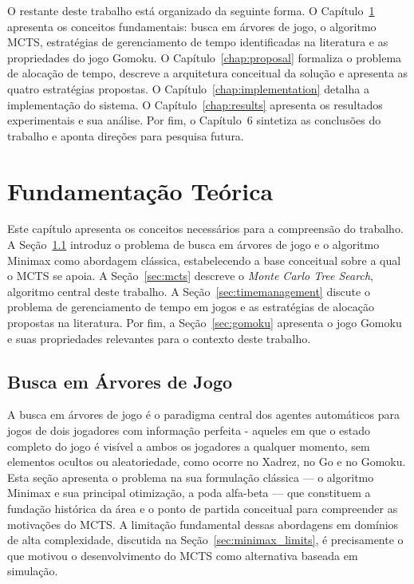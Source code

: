 \documentclass[cic,tc]{iiufrgs}
\begin{document}
O restante deste trabalho está organizado da seguinte forma. O Capítulo~\ref{chap:background} apresenta os conceitos fundamentais: busca em árvores de jogo, o algoritmo MCTS, estratégias de gerenciamento de tempo identificadas na literatura e as propriedades do jogo Gomoku. O Capítulo~\ref{chap:proposal} formaliza o problema de alocação de tempo, descreve a arquitetura conceitual da solução e apresenta as quatro estratégias propostas. O Capítulo~\ref{chap:implementation} detalha a implementação do sistema. O Capítulo~\ref{chap:results} apresenta os resultados experimentais e sua análise. Por fim, o Capítulo~6 sintetiza as conclusões do trabalho e aponta direções para pesquisa futura.

\chapter{Fundamentação Teórica}
\label{chap:background}

Este capítulo apresenta os conceitos necessários para a compreensão do trabalho. A Seção~\ref{sec:minimax} introduz o problema de busca em árvores de jogo e o algoritmo Minimax como abordagem clássica, estabelecendo a base conceitual sobre a qual o MCTS se apoia. A Seção~\ref{sec:mcts} descreve o \emph{Monte Carlo Tree Search}, algoritmo central deste trabalho. A Seção~\ref{sec:timemanagement} discute o problema de gerenciamento de tempo em jogos e as estratégias de alocação propostas na literatura. Por fim, a Seção~\ref{sec:gomoku} apresenta o jogo Gomoku e suas propriedades relevantes para o contexto deste trabalho.

\section{Busca em Árvores de Jogo}
\label{sec:minimax}

A busca em árvores de jogo é o paradigma central dos agentes automáticos para jogos de dois jogadores com informação perfeita - aqueles em que o estado completo do jogo é visível a ambos os jogadores a qualquer momento, sem elementos ocultos ou aleatoriedade, como ocorre no Xadrez, no Go e no Gomoku. Esta seção apresenta o problema na sua formulação clássica — o algoritmo Minimax \cite{russell2016artificial} e sua principal otimização, a poda alfa-beta — que constituem a fundação histórica da área e o ponto de partida conceitual para compreender as motivações do MCTS. A limitação fundamental dessas abordagens em domínios de alta complexidade, discutida na Seção~\ref{sec:minimax_limits}, é precisamente o que motivou o desenvolvimento do MCTS como alternativa baseada em simulação.
\end{document}
